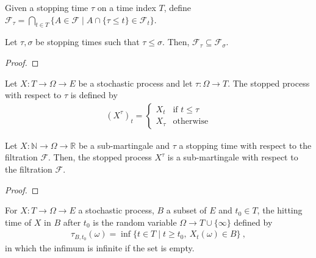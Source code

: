 \begin{definition}\label{def:StoppingTimeGen}
  \mathlibok
  Given a stopping time $\tau$ on a time index $T$, define
  $\mathcal{F}_\tau = \bigcap_{t \in T} \{A \in \mathcal{F} \mid A \cap \{\tau \le t\} \in \mathcal{F}_t\}.$
\end{definition}


\begin{lemma}\label{lem:StoppingTimeGenMono}
  \mathlibok
  Let $\tau, \sigma$ be stopping times such that $\tau \le \sigma$.
  Then, $\mathcal{F}_\tau \subseteq \mathcal{F}_\sigma$.
\end{lemma}

\begin{proof}\leanok

\end{proof}


\begin{definition}\label{def:stoppedProcess}
  \mathlibok
Let $X : T \to \Omega \to E$ be a stochastic process and let $\tau : \Omega \to T$.
The stopped process with respect to $\tau$ is defined by
\begin{align*}
  (X^{\tau})_t = \begin{cases}
    X_t & \text{if } t \le \tau \\
    X_{\tau} & \text{otherwise}
  \end{cases}
\end{align*}
\end{definition}


\begin{lemma}\label{lem:Submartingale.stoppedProcess}
  \mathlibok
Let $X : \mathbb{N} \to \Omega \to \mathbb{R}$ be a sub-martingale and $\tau$ a stopping time with respect to the filtration $\mathcal{F}$.
Then, the stopped process $X^{\tau}$ is a sub-martingale with respect to the filtration $\mathcal{F}$.
\end{lemma}

\begin{proof}\leanok

\end{proof}


\begin{definition}\label{def:hittingAfter}
  \mathlibok
For $X : T \to \Omega \to E$ a stochastic process, $B$ a subset of $E$ and $t_0 \in T$, the hitting time of $X$ in $B$ after $t_0$ is the random variable $\Omega \to T\cup\{\infty\}$ defined by
\begin{align*}
  \tau_{B, t_0}(\omega) = \inf\{t \in T \mid t \ge t_0, \: X_t(\omega) \in B\} \: ,
\end{align*}
in which the infimum is infinite if the set is empty.
\end{definition}


